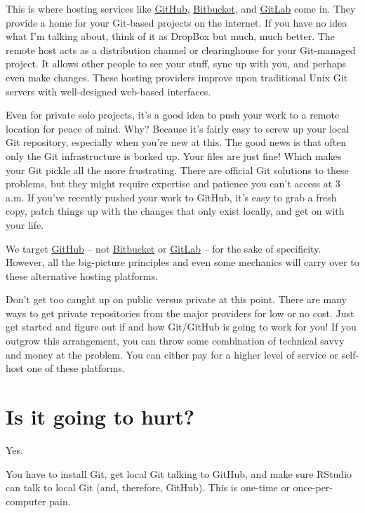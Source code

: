\documentclass[
]{book}
\begin{document}
This is where hosting services like \href{https://github.com}{GitHub}, \href{https://bitbucket.org}{Bitbucket}, and \href{https://about.gitlab.com}{GitLab} come in. They provide a home for your Git-based projects on the internet. If you have no idea what I'm talking about, think of it as DropBox but much, much better. The remote host acts as a distribution channel or clearinghouse for your Git-managed project. It allows other people to see your stuff, sync up with you, and perhaps even make changes. These hosting providers improve upon traditional Unix Git servers with well-designed web-based interfaces.

Even for private solo projects, it's a good idea to push your work to a remote location for peace of mind. Why? Because it's fairly easy to screw up your local Git repository, especially when you're new at this. The good news is that often only the Git infrastructure is borked up. Your files are just fine! Which makes your Git pickle all the more frustrating. There are official Git solutions to these problems, but they might require expertise and patience you can't access at 3 a.m. If you've recently pushed your work to GitHub, it's easy to grab a fresh copy, patch things up with the changes that only exist locally, and get on with your life.

We target \href{https://github.com}{GitHub} -- not \href{https://bitbucket.org}{Bitbucket} or \href{https://about.gitlab.com}{GitLab} -- for the sake of specificity. However, all the big-picture principles and even some mechanics will carry over to these alternative hosting platforms.

Don't get too caught up on public versus private at this point. There are many ways to get private repositories from the major providers for low or no cost. Just get started and figure out if and how Git/GitHub is going to work for you! If you outgrow this arrangement, you can throw some combination of technical savvy and money at the problem. You can either pay for a higher level of service or self-host one of these platforms.

\section{Is it going to hurt?}\label{is-it-going-to-hurt}

Yes.

You have to install Git, get local Git talking to GitHub, and make sure RStudio can talk to local Git (and, therefore, GitHub). This is one-time or once-per-computer pain.
\end{document}
